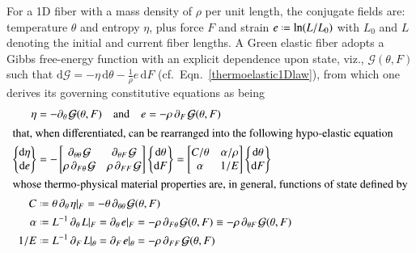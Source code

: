 For a 1D fiber with a mass density of $\rho$ per unit length, the conjugate fields are: temperature $\theta$ and entropy $\eta$, plus force $F$ and strain $e \defeq \ln (L/L_0)$ with $L_0$ and $L$ denoting the initial and current fiber lengths.  A Green elastic fiber adopts a Gibbs free-energy function with an explicit dependence upon state, viz., $\mathcal{G} (\theta , F)$ such that $\mathrm{d} \mathcal{G} = -\eta \, \mathrm{d} \theta - \tfrac{1}{\rho} e \, \mathrm{d}F$ (cf.~Eqn.~\ref{thermoelastic1Dlaw}), from which one derives its governing constitutive equations as being
\begin{subequations}
    \label{fiberConstitutiveTheory}
    \begin{align}
\eta & = -\partial_{\theta\,} \mathcal{G} (\theta , F)
\quad \text{and} \quad
e = -\rho \, \partial_{F\,} \mathcal{G} (\theta, F)
\label{entropyStrain1D} \\
\intertext{that, when differentiated, can be rearranged into the following hypo-elastic equation}
\left\{ \begin{matrix}
\mathrm{d} \eta \\ \mathrm{d} e 
\end{matrix} \right\} & = -\begin{bmatrix}
\partial_{\theta\theta\,} \mathcal{G} & \partial_{\theta F\,} \mathcal{G} \\
\rho \, \partial_{F\theta\,} \mathcal{G} & \rho \, \partial_{FF\,} \mathcal{G}
\end{bmatrix} 
\left\{ \begin{matrix}
\mathrm{d} \theta \\ \mathrm{d} F
\end{matrix} \right\}
= \begin{bmatrix}
C / \theta & \alpha / \rho \\
\alpha & 1 / E
\end{bmatrix}
\left\{ \begin{matrix}
\mathrm{d} \theta \\ \mathrm{d} F
\end{matrix} \right\}
\label{thermoelasticCE1D} \\
    \intertext{whose thermo-physical material properties are, in general, functions of state defined by}
    C & \defeq \theta \, \partial_{\theta\,} \eta |_F = 
    -\theta \, \partial_{\theta\theta\,} \mathcal{G} (\theta , F)
    \label{specificHeat} \\
    \alpha & \defeq L^{-1} \, \partial_{\theta\,} L |_F = \partial_{\theta\,} e |_F =
    -\rho \, \partial_{F\theta\,} \mathcal{G} (\theta , F) \equiv
    -\rho \, \partial_{\theta F\,} \mathcal{G} (\theta , F)
    \label{thermalExpansion} \\
    1 / E & \defeq L^{-1} \, \partial_{F\,} L |_{\theta} = \partial_{F\,} e |_{\theta} =
    -\rho \, \partial_{FF\,} \mathcal{G} (\theta , F)
    \label{compliance}
    \end{align}
\end{subequations}
